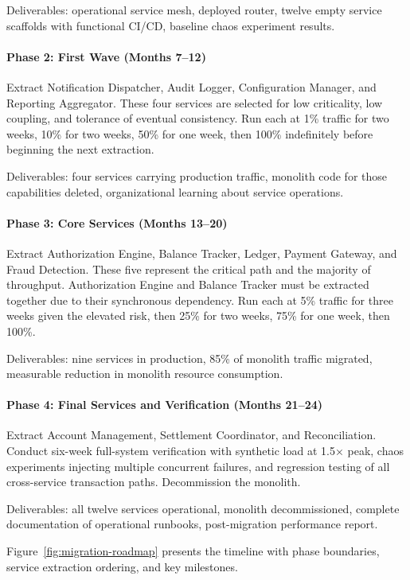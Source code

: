 Deliverables: operational service mesh, deployed router, twelve empty service scaffolds with functional CI/CD, baseline chaos experiment results.

\paragraph{Phase 2: First Wave (Months 7--12)}
Extract Notification Dispatcher, Audit Logger, Configuration Manager, and Reporting Aggregator. These four services are selected for low criticality, low coupling, and tolerance of eventual consistency. Run each at 1\% traffic for two weeks, 10\% for two weeks, 50\% for one week, then 100\% indefinitely before beginning the next extraction.

Deliverables: four services carrying production traffic, monolith code for those capabilities deleted, organizational learning about service operations.

\paragraph{Phase 3: Core Services (Months 13--20)}
Extract Authorization Engine, Balance Tracker, Ledger, Payment Gateway, and Fraud Detection. These five represent the critical path and the majority of throughput. Authorization Engine and Balance Tracker must be extracted together due to their synchronous dependency. Run each at 5\% traffic for three weeks given the elevated risk, then 25\% for two weeks, 75\% for one week, then 100\%.

Deliverables: nine services in production, 85\% of monolith traffic migrated, measurable reduction in monolith resource consumption.

\paragraph{Phase 4: Final Services and Verification (Months 21--24)}
Extract Account Management, Settlement Coordinator, and Reconciliation. Conduct six-week full-system verification with synthetic load at 1.5× peak, chaos experiments injecting multiple concurrent failures, and regression testing of all cross-service transaction paths. Decommission the monolith.

Deliverables: all twelve services operational, monolith decommissioned, complete documentation of operational runbooks, post-migration performance report.

Figure~\ref{fig:migration-roadmap} presents the timeline with phase boundaries, service extraction ordering, and key milestones.

